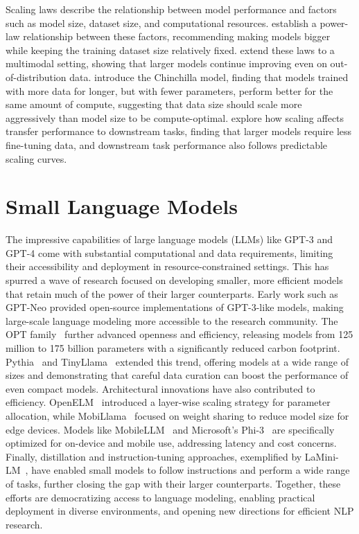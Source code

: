 Scaling laws describe the relationship between model performance and factors such as model size, dataset size, and computational resources. \citet{kaplan2020scaling} establish a power-law relationship between these factors, recommending making models bigger while keeping the training dataset size relatively fixed. \citet{henighan2020scaling} extend these laws to a multimodal setting, showing that larger models continue improving even on out-of-distribution data. \citet{hoffman2022chinchilla} introduce the Chinchilla model, finding that models trained with more data for longer, but with fewer parameters, perform better for the same amount of compute, suggesting that data size should scale more aggressively than model size to be compute-optimal. \citet{hernandez2021scaling} explore how scaling affects transfer performance to downstream tasks, finding that larger models require less fine-tuning data, and downstream task performance also follows predictable scaling curves.

\section{Small Language Models}

The impressive capabilities of large language models (LLMs) like GPT-3 and GPT-4 come with substantial computational and data requirements, limiting their accessibility and deployment in resource-constrained settings. This has spurred a wave of research focused on developing smaller, more efficient models that retain much of the power of their larger counterparts.
Early work such as GPT-Neo provided open-source implementations of GPT-3-like models, making large-scale language modeling more accessible to the research community. The OPT family~\citep{zhang2022opt} further advanced openness and efficiency, releasing models from 125 million to 175 billion parameters with a significantly reduced carbon footprint. Pythia~\citep{biderman2023pythia} and TinyLlama~\citep{zhang2024tinyllama} extended this trend, offering models at a wide range of sizes and demonstrating that careful data curation can boost the performance of even compact models.
Architectural innovations have also contributed to efficiency. OpenELM~\citep{mehta2024openelm} introduced a layer-wise scaling strategy for parameter allocation, while MobiLlama~\citep{thawakar2024mobillama} focused on weight sharing to reduce model size for edge devices. Models like MobileLLM~\citep{liu2024mobilellm} and Microsoft's Phi-3~\citep{abdin2024phi} are specifically optimized for on-device and mobile use, addressing latency and cost concerns.
Finally, distillation and instruction-tuning approaches, exemplified by LaMini-LM~\citep{wu2024lamini}, have enabled small models to follow instructions and perform a wide range of tasks, further closing the gap with their larger counterparts.
Together, these efforts are democratizing access to language modeling, enabling practical deployment in diverse environments, and opening new directions for efficient NLP research.



